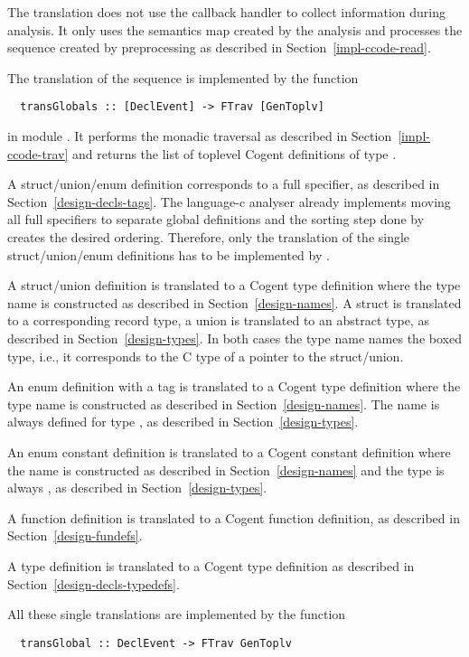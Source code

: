 The translation does not use the callback handler to collect information during analysis. It only uses the semantics map
created by the analysis and processes the  sequence created by preprocessing as described in 
Section~\ref{impl-ccode-read}.

The translation of the  sequence is implemented by the function
\begin{verbatim}
  transGlobals :: [DeclEvent] -> FTrav [GenToplv]
\end{verbatim}
in module .
It performs the monadic traversal as described in Section~\ref{impl-ccode-trav} and returns the list of toplevel
Cogent definitions of type .

A struct/union/enum definition corresponds to a full specifier, as described in Section~\ref{design-decls-tags}.
The language-c analyser already implements moving all full specifiers to separate global definitions and the
sorting step done by  creates the desired ordering. Therefore, only the translation
of the single struct/union/enum definitions has to be implemented by .

A struct/union definition is translated to a Cogent type definition where the type name is constructed as described 
in Section~\ref{design-names}. A struct is translated to a corresponding record type, a union is translated to an 
abstract type, as described in Section~\ref{design-types}.
In both cases the type name names the boxed type, i.e., it corresponds to the C type of a pointer to the struct/union.

An enum definition with a tag is translated to a Cogent type definition where the type name is constructed as described 
in Section~\ref{design-names}. The name is always defined for type , as described in Section~\ref{design-types}.

An enum constant definition is translated to a Cogent constant definition where the name is constructed as described 
in Section~\ref{design-names} and the type is always , as described in Section~\ref{design-types}.

A function definition is translated to a Cogent function definition, as described in Section~\ref{design-fundefs}.

A type definition is translated to a Cogent type definition as described in Section~\ref{design-decls-typedefs}.

All these single translations are implemented by the function
\begin{verbatim}
  transGlobal :: DeclEvent -> FTrav GenToplv
\end{verbatim}

